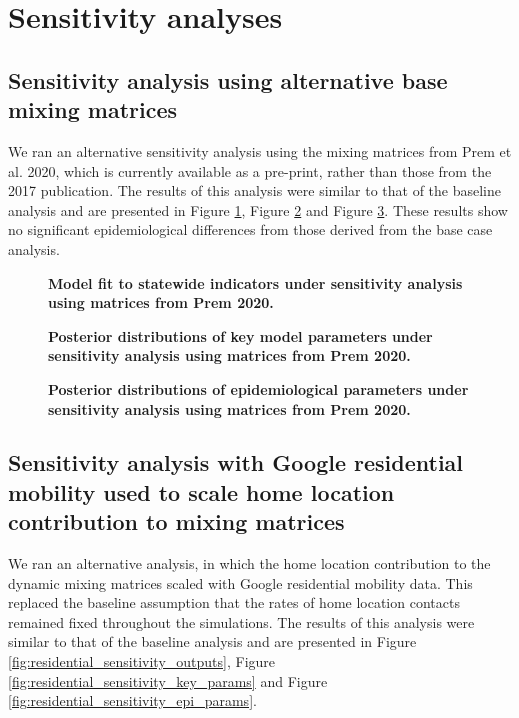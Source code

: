 
\section{Sensitivity analyses}
\subsection{Sensitivity analysis using alternative base mixing matrices}
We ran an alternative sensitivity analysis using the mixing matrices from Prem et al. 2020,\cite{RN81} which is currently available as a pre-print, rather than those from the 2017 publication. The results of this analysis were similar to that of the baseline analysis and are presented in Figure \ref{fig:prem_sensitivity_outputs}, Figure \ref{fig:prem_sensitivity_key_params} and Figure \ref{fig:prem_sensitivity_epi_params}. These results show no significant epidemiological differences from those derived from the base case analysis.

\begin{figure}[ht]
    \caption{\textbf{Model fit to statewide indicators under sensitivity analysis using matrices from Prem 2020.}}
    \label{fig:prem_sensitivity_outputs}
\end{figure}

\begin{figure}[ht]
    \caption{\textbf{Posterior distributions of key model parameters under sensitivity analysis using matrices from Prem 2020.}}
    \label{fig:prem_sensitivity_key_params}
\end{figure}

\begin{figure}[ht]
    \caption{\textbf{Posterior distributions of epidemiological parameters under sensitivity analysis using matrices from Prem 2020.}}
    \label{fig:prem_sensitivity_epi_params}
\end{figure}

\subsection{Sensitivity analysis with Google residential mobility used to scale home location contribution to mixing matrices}
We ran an alternative analysis, in which the home location contribution to the dynamic mixing matrices scaled with Google residential mobility data. This replaced the baseline assumption that the rates of home location contacts remained fixed throughout the simulations. The results of this analysis were similar to that of the baseline analysis and are presented in Figure \ref{fig:residential_sensitivity_outputs}, Figure \ref{fig:residential_sensitivity_key_params} and Figure \ref{fig:residential_sensitivity_epi_params}.

